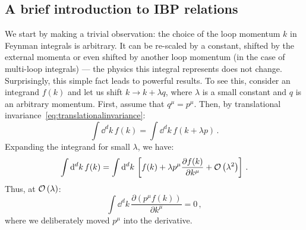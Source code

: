 \documentclass[main.tex]{subfiles}
\begin{document}
\subsection{A brief introduction to IBP relations} \label{sec:ibpintro}
We start by making a trivial observation: the choice of the loop momentum $k$ in Feynman integrals is arbitrary. It can be re-scaled by a constant, shifted by the external momenta or even shifted by another loop momentum (in the case of multi-loop integrals) --- the physics this integral represents does not change. Surprisingly, this simple fact leads to powerful results. To see this, consider an integrand $f(k)$ and let us shift $k \rightarrow k + \lambda q$, where $\lambda$ is a small constant and $q$ is an arbitrary momentum. First, assume that $q^\mu = p^\mu$. Then, by translational invariance~\ref{eq:translationalinvariance}:
\begin{equation}
    \int \dd^d k\, f(k) = \int \dd^d k\, f(k+\lambda p) \,.
\end{equation}
Expanding the integrand for small $\lambda$, we have:
\begin{equation}
    \int \mathrm{d}^d k\, f(k) = \int \mathrm{d}^d k\, \left[ f(k) + \lambda p^\mu \frac{\partial f(k)}{\partial k^\mu} + \mathcal{O}\left(\lambda^2\right) \right]\,.
\end{equation}
Thus, at $\mathcal{O}\left(\lambda\right)$:
\begin{equation}
    \int \dd^d k\, \frac{\partial (p^\mu f(k))}{\partial k^\mu} = 0\,,
\end{equation}
where we deliberately moved $p^\mu$ into the derivative.
\end{document}
